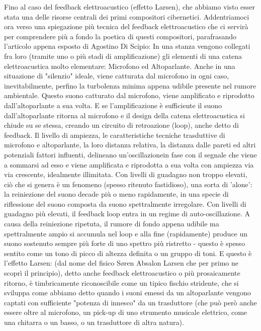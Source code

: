 Fino al caso del feedback elettroacustico (effetto Larsen), che abbiamo visto
esser stata una delle risorse centrali dei primi compositori cibernetici.
Addentriamoci ora verso una spiegazione più tecnica del feedback elettroacustico
che ci servirà per comprendere più a fondo la poetica di questi compositori,
parafrasando l'articolo appena esposto di Agostino Di Scipio:
In una stanza vengono collegati fra loro (tramite uno o più stadi di amplificazione) gli
elementi di una catena elettroacustica molto elementare: Microfono ed Altoparlante. Anche in
una situazione di "silenzio" ideale, viene catturata dal microfono in ogni caso,
inevitabilmente,
perfino la turbolenza minima appena udibile presente nel rumore ambientale.
Questo suono catturato dal microfono, viene amplificato e riprodotto dall’altoparlante a sua
volta. E se l'amplificazione è sufficiente il suono dall’altoparlante ritorna al microfono e
il design della catena elettroacustica si chiude su se stessa,
creando un circuito di
retroazione (loop), anche detto di feedback.
Il livello di ampiezza, le caratteristiche
tecniche trasduttive di microfono e altoparlante, la loro distanza relativa, la distanza dalle
pareti ed altri potenziali fattori influenti, delineano un’oscillazionein fase con il segnale
che viene a sommarsi ad esso e viene amplificata e riprodotta a sua volta con ampiezza via via
crescente, idealmente illimitata. Con livelli di guadagno non troppo elevati, ciò che si
genera è un fenomeno (spesso ritenuto fastidioso), una sorta di 'alone':
la reiniezione del suono decade più o meno
rapidamente, in una specie di riflessione del suono composta da suono spettralmente irregolare.
Con livelli di guadagno più elevati, il feedback loop entra in un regime di auto-oscillazione.
A causa della reiniezione ripetuta, il rumore di fondo appena udibile ma spettralmente ampio
si accumula nel loop e alla fine (rapidamente) produce un suono sostenuto sempre più forte di
uno spettro più ristretto - questo è spesso sentito come un tono di picco di altezza definita
o un gruppo di toni. E questo è l'effetto Larsen: (dal nome del fisico Søren Absalon Larsen
che per primo ne scoprì il principio), detto anche feedback elettroacustico o più prosaicamente
ritorno, è timbricamente riconoscibile come un tipico fischio stridente, che si sviluppa come
abbiamo detto quando i suoni emessi da un altoparlante vengono captati con sufficiente
"potenza di innesco" da un trasduttore (che può però anche essere oltre al microfono, un
pick-up di uno strumento musicale elettrico, come una chitarra o un basso, o un trasduttore di
altra natura).

